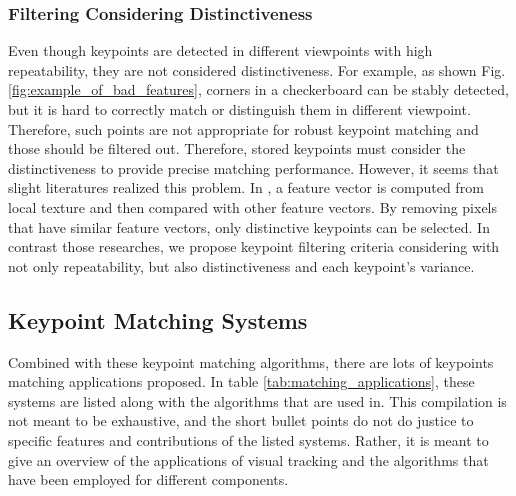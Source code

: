 \subsubsection{Filtering Considering Distinctiveness}
Even though keypoints are detected in different viewpoints with high repeatability, they are not considered distinctiveness. For example, as shown Fig. \ref{fig:example_of_bad_features}, corners in a checkerboard can be stably detected, but it is hard to correctly match or distinguish them in different viewpoint. Therefore, such points are not appropriate for robust keypoint matching and those should be filtered out. Therefore, stored keypoints must consider the distinctiveness to provide precise matching performance. However, it seems that slight literatures realized this problem. In \cite{knapek_selecting_2000,oerlemans_interest_2008}, a feature vector is computed from local texture and then compared with other feature vectors. By removing pixels that have similar feature vectors, only distinctive keypoints can be selected. In contrast those researches, we propose keypoint filtering criteria considering with not only repeatability, but also distinctiveness and each keypoint's variance. 

\subsection{Keypoint Matching Systems}
Combined with these keypoint matching algorithms, there are lots of keypoints matching applications proposed. In table \ref{tab:matching_applications}, these systems are listed along with the algorithms that are used in.  This compilation is not meant to be exhaustive, and the short bullet points do not do justice to specific features and contributions of the listed systems. Rather, it is meant to give an overview of the applications of visual tracking and the algorithms that have been employed for different components.


